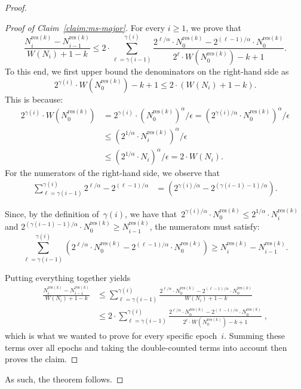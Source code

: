 \documentclass[sigconf]{acmart}
\newcommand{\parentheses}[1]{\left(#1\right)}
\begin{document}
\begin{proof}
\begin{proof}[Proof of Claim~\ref{claim:ms-major}]
        \noindent
        For every $i \geq 1$, we prove that
        $$ \frac{N^{\text{res}(k)}_{i}- N^{\text{res}(k)}_{i-1}}{W(N_i)+1-k} \leq 2 \cdot  \sum_{\ell=\gamma(i-1)}^{\gamma(i)} \frac{2^{\ell/\alpha} \cdot N^{\text{res}(k)}_0 - 2^{(\ell-1)/\alpha} \cdot N^{\text{res}(k)}_0}{2^{\ell} \cdot W\parentheses{N^{\text{res}(k)}_0 }-k+1}. $$
        \noindent
        To this end, we first upper bound the denominators on the right-hand
        side as
        $$ 2^{\gamma(i)} \cdot W\parentheses{N^{\text{res}(k)}_0 }-k+1 \leq 2 \cdot \parentheses{{W(N_i)+1-k}}. $$
        \noindent
        This is because:
        \begin{align*}
            2^{\gamma(i)} \cdot W\parentheses{N^{\text{res}(k)}_0 } &=	2^{\gamma(i)} \cdot \parentheses{N^{\text{res}(k)}_0 }^{\alpha} /\epsilon = \parentheses{2^{\gamma(i)/\alpha} \cdot N^{\text{res}(k)}_0}^\alpha /\epsilon\\
            & \leq \parentheses{2^{1/\alpha} \cdot N^{\text{res}(k)}_i}^\alpha /\epsilon\\
            & \leq \parentheses{2^{1/\alpha} \cdot N_i}^\alpha /\epsilon= 2  \cdot W(N_i).
        \end{align*}
        \noindent
        For the numerators of the right-hand side, we observe that
        \begin{align*}
            \sum_{\ell=\gamma(i-1)}^{\gamma(i)} 2^{\ell/\alpha}  - 2^{(\ell-1)/\alpha} 
            & = \parentheses{2^{\gamma(i)/\alpha} - 2^{(\gamma(i-1)-1)/\alpha} }.
        \end{align*}

        Since, by the definition of~$\gamma(i)$, we have
        that~$2^{\gamma(i)/\alpha}\cdot N^{\text{res}(k)}_0 \leq 2^{1/\alpha}
        \cdot N^{\text{res}(k)}_i$ and $2^{(\gamma(i-1)-1)/\alpha}\cdot
        N^{\text{res}(k)}_0 \geq N^{\text{res}(k)}_{i-1}$, the
        numerators must satisfy:
        $$ \sum_{\ell=\gamma(i-1)}^{\gamma(i)} \parentheses{2^{\ell/\alpha} \cdot N^{\text{res}(k)}_0 - 2^{(\ell-1)/\alpha} \cdot N^{\text{res}(k)}_0} \geq N^{\text{res}(k)}_{i}- N^{\text{res}(k)}_{i-1}. $$ 

        Putting everything together yields
        \begin{align*}
            \frac{N^{\text{res}(k)}_{i}- N^{\text{res}(k)}_{i-1}}{W(N_i)+1-k} & \leq 
            \sum_{\ell=\gamma(i-1)}^{\gamma(i)} \frac{2^{\ell/\alpha} \cdot N^{\text{res}(k)}_0 - 2^{(\ell-1)/\alpha} \cdot N^{\text{res}(k)}_0}{W(N_i)+1-k}\\
            &\leq 2 \cdot  \sum_{\ell=\gamma(i-1)}^{\gamma(i)} \frac{2^{\ell/\alpha} \cdot N^{\text{res}(k)}_0 - 2^{(\ell-1)/\alpha} \cdot N^{\text{res}(k)}_0}{2^{\ell} \cdot W\parentheses{N^{\text{res}(k)}_0 }-k+1} \;,
        \end{align*}
        which is what we wanted to prove for every specific epoch~$i$. Summing
        these terms over all epochs and taking the double-counted terms into
        account then proves the claim.
    \end{proof}	
    As such, the theorem follows.
\end{proof}
\end{document}
